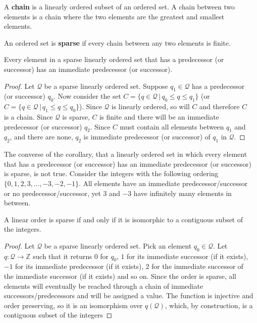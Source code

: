 \begin{mathSection}
	\begin{defn}
		A \textbf{chain} is a linearly ordered subset of an ordered set. A chain between two elements is a chain where the two elements are the greatest and smallest elements.
	\end{defn}
	\begin{defn}
		An ordered set is \textbf{sparse} if every chain between any two elements is finite.
	\end{defn}
	\begin{coro}
		Every element in a sparse linearly ordered set that has a predecessor (or successor) has an immediate predecessor (or successor).
	\end{coro}
	\begin{proof}
		Let $\mathcal{Q}$ be a sparse linearly ordered set. Suppose $q_1 \in \mathcal{Q}$ has a predecessor (or successor) $q_0$. Now consider the set $C = \{q \in \mathcal{Q} \, | \, q_0 \leq q \leq q_1 \}$ (or $C = \{q \in \mathcal{Q} \, | \, q_1 \leq q \leq q_0 \}$). Since $\mathcal{Q}$ is linearly ordered, so will $C$ and therefore $C$ is a chain. Since $\mathcal{Q}$ is sparse, $C$ is finite and there will be an immediate predecessor (or successor) $q_2$. Since $C$ must contain all elements between $q_1$ and $q_2$, and there are none, $q_2$ is immediate predecessor (or successor) of $q_1$ in $\mathcal{Q}$.
	\end{proof}
	
	\begin{remark}
		The converse of the corollary, that a linearly ordered set in which every element that has a predecessor (or successor) has an immediate predecessor (or successor) is sparse, is not true. Consider the integers with the following ordering $\{0, 1, 2, 3, ... , -3, -2, -1\}$. All elements have an immediate predecessor/successor or no predecessor/successor, yet $3$ and $-3$ have infinitely many elements in between.
	\end{remark}
	\begin{prop}
		A linear order is sparse if and only if it is isomorphic to a contiguous subset of the integers.
	\end{prop}
	\begin{proof}
		Let $\mathcal{Q}$ be a sparse linearly ordered set. Pick an element $q_0 \in \mathcal{Q}$. Let $q : \mathcal{Q} \to \mathbb{Z}$ such that it returns $0$ for $q_0$, $1$ for its immediate successor (if it exists), $-1$ for its immediate predecessor (if it exists), $2$ for the immediate successor of the immediate successor (if it exists) and so on. Since the order is sparse, all elements will eventually be reached through a chain of immediate successors/predecessors and will be assigned a value. The function is injective and order preserving, so it is an isomorphism over $q(\mathcal{Q})$, which, by construction, is a contiguous subset of the integers
		

\end{proof}
\end{mathSection}
